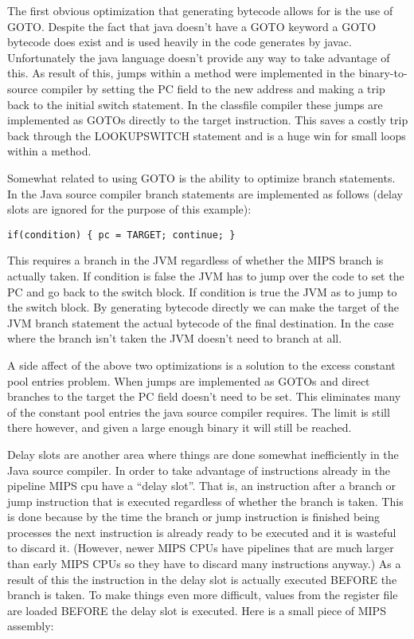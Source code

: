 \documentclass{acmconf}
\begin{document}
The first obvious optimization that generating bytecode allows for is the
use of GOTO. Despite the fact that java doesn't have a GOTO keyword a GOTO
bytecode does exist and is used heavily in the code generates by javac.
Unfortunately the java language doesn't provide any way to take advantage of
this. As result of this, jumps within a method were implemented in the
binary-to-source compiler by setting the PC field to the new address and
making a trip back to the initial switch statement.  In the classfile
compiler these jumps are implemented as GOTOs directly to the target
instruction. This saves a costly trip back through the LOOKUPSWITCH
statement and is a huge win for small loops within a method.

Somewhat related to using GOTO is the ability to optimize branch
statements. In the Java source compiler branch statements are
implemented as follows (delay slots are ignored for the purpose of
this example):

{\footnotesize\begin{verbatim}
if(condition) { pc = TARGET; continue; }
\end{verbatim}}

This requires a branch in the JVM regardless of whether the MIPS
branch is actually taken. If condition is false the JVM has to jump
over the code to set the PC and go back to the switch block. If
condition is true the JVM as to jump to the switch block. By
generating bytecode directly we can make the target of the JVM branch
statement the actual bytecode of the final destination. In the case
where the branch isn't taken the JVM doesn't need to branch at all.

A side affect of the above two optimizations is a solution to the
excess constant pool entries problem. When jumps are implemented as
GOTOs and direct branches to the target the PC field doesn't need to
be set. This eliminates many of the constant pool entries the java
source compiler requires. The limit is still there however, and given
a large enough binary it will still be reached.

Delay slots are another area where things are done somewhat
inefficiently in the Java source compiler. In order to take advantage
of instructions already in the pipeline MIPS cpu have a ``delay
slot''. That is, an instruction after a branch or jump instruction that
is executed regardless of whether the branch is taken. This is done
because by the time the branch or jump instruction is finished being
processes the next instruction is already ready to be executed and it
is wasteful to discard it. (However, newer MIPS CPUs have pipelines
that are much larger than early MIPS CPUs so they have to discard many
instructions anyway.) As a result of this the instruction in the delay
slot is actually executed BEFORE the branch is taken. To make things
even more difficult, values from the register file are loaded BEFORE
the delay slot is executed.  Here is a small piece of MIPS assembly:
\end{document}

